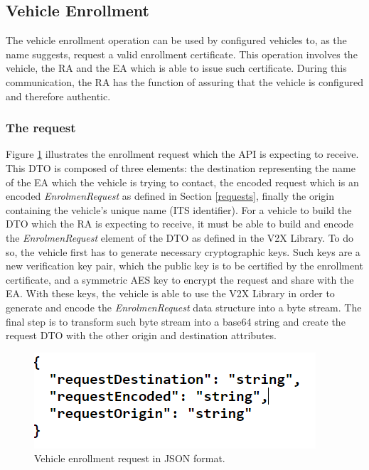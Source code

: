 \subsection{Vehicle Enrollment}
The vehicle enrollment operation can be used by configured vehicles to, as the name suggests, request a valid enrollment certificate. This operation involves the vehicle, the RA and the EA which is able to issue such certificate. During this communication, the RA has the function of assuring that the vehicle is configured and therefore authentic.

\subsubsection{The request}
Figure \ref{fig:enrol_req} illustrates the enrollment request which the API is expecting to receive. This DTO is composed of three elements: the destination representing the name of the EA which the vehicle is trying to contact, the encoded request which is an encoded \textit{EnrolmenRequest} as defined in Section \ref{requests}, finally the origin containing the vehicle's unique name (ITS identifier). For a vehicle to build the DTO which the RA is expecting to receive, it must be able to build and encode the \textit{EnrolmenRequest} element of the DTO as defined in the V2X Library. To do so, the vehicle first has to generate necessary cryptographic keys. Such keys are a new verification key pair, which the public key is to be certified by the enrollment certificate, and a symmetric AES key to encrypt the request and share with the EA. With these keys, the vehicle is able to use the V2X Library in order to generate and encode the \textit{EnrolmenRequest} data structure into a byte stream. The final step is to transform such byte stream into a base64 string and create the request DTO with the other origin and destination attributes.

\begin{figure}[!h]
	\centering
	\includegraphics[width=0.5
	\textwidth]{Figures/enrol_req}
	\caption{\label{fig:enrol_req}Vehicle enrollment request in JSON format.}
\end{figure}

